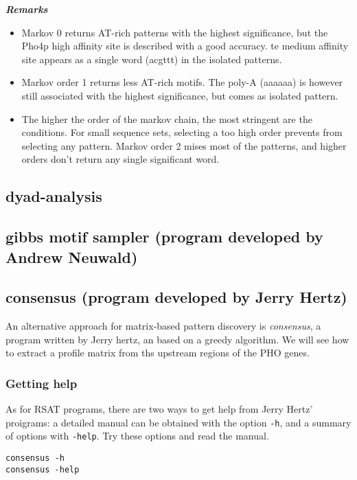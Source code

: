 \textit{\textbf{Remarks}}
\begin{itemize}
\item 
Markov 0 returns AT-rich patterns with the highest significance, but
the Pho4p high affinity site is described with a good accuracy. te
medium affinity site appears as a single word (acgttt) in the isolated
patterns.
\item 
Markov order 1 returns less AT-rich motifs. The poly-A (aaaaaa) is
however still associated with the highest significance, but comes as
isolated pattern.
\item 
The higher the order of the markov chain, the most stringent are the
conditions. For small sequence sets, selecting a too high order
prevents from selecting any pattern. Markov order 2 mises most of the
patterns, and higher orders don't return any single significant word.
\end{itemize}

\subsection{dyad-analysis}



\subsection{gibbs motif sampler (program developed by Andrew Neuwald)}




\subsection{consensus (program developed by Jerry Hertz)}

An alternative approach for matrix-based pattern discovery is
\textit{consensus}, a program written by Jerry hertz, an based on a
greedy algorithm. We will see how to extract a profile matrix from ths
upstream regions of the PHO genes.

\subsubsection{Getting help}

As for RSAT programs, there are two ways to get help from Jerry Hertz'
proigrams: a detailed manual can be obtained with the option
\texttt{-h}, and a summary of options with \texttt{-help}. Try these
options and read the manual.

\begin{verbatim}
consensus -h
consensus -help
\end{verbatim}

